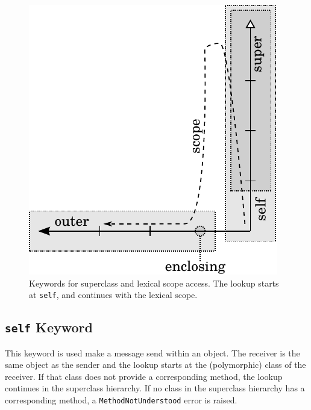 \begin{figure}[!htp]
	\centering
	\includegraphics[scale=1]{lookup_keywords.pdf}
	\caption[Keywords for superclass and lexical scope access]{Keywords for superclass and lexical scope access. The lookup starts at \texttt{self}, and continues with the lexical scope.}
	\label{fig:concept_keywords}
\end{figure}

\subsection{\texttt{self} Keyword}
This keyword is used make a message send within an object. The receiver is the same object as the sender and the lookup starts at the (polymorphic) class of the receiver. If that class does not provide a corresponding method, the lookup continues in the superclass hierarchy. If no class in the superclass hierarchy has a corresponding method, a \texttt{MethodNotUnderstood} error is raised.

